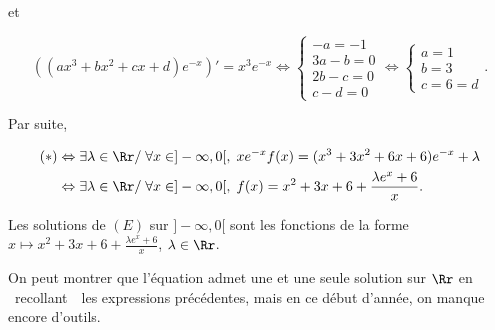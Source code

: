 {{et

$$((ax^3+bx^2+cx+d)e^{-x})'=x^3e^{-x}\Leftrightarrow
\left\{
\begin{array}{l}
-a=-1\\
3a-b=0\\
2b-c=0\\
c-d=0
\end{array}
\right.
\Leftrightarrow
\left\{
\begin{array}{l}
a=1\\
b=3\\
c=6=d
\end{array}
\right..$$

Par suite,

\begin{align*}\ensuremath
(*)&\Leftrightarrow\exists\lambda\in\Rr/\;\forall x\in]-\infty,0[,\;xe^{-x}f(x)=(x^3+3x^2+6x+6)e^{-x}+\lambda\\
 &\Leftrightarrow\exists\lambda\in\Rr/\;\forall x\in]-\infty,0[,\;
f(x)=x^2+3x+6+\frac{\lambda e^x+6}{x}.
\end{align*}

Les solutions de $(E)$ sur $]-\infty,0[$ sont les fonctions de la forme $x\mapsto x^2+3x+6+\frac{\lambda e^x+6}{x}$,
$\lambda\in\Rr$.

On peut montrer que l'équation admet une et une seule solution sur $\Rr$ en \og~recollant~\fg~les expressions
précédentes, mais en ce début d'année, on manque encore d'outils.}
}